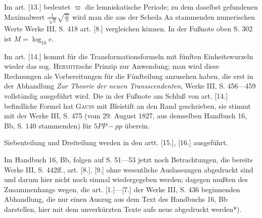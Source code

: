 \par\indent Im art. [13.] bedeutet $\varpi$ die lemniskatische Periode; zu dem daselbst gefundenen Maximalwert $\frac1{\sqrt[4]{2}}\sqrt{\frac\varpi\pi}$ wird man die aus der Scheda Aa stammenden numerischen Werte Werke III, S. 418 art. [8.] vergleichen können. In der Fußnote oben S. 302 ist $M=\log_{10}e$.
\par\medskip{}\par
\clearpage{}
\par\indent Im art. [14.] kommt für die Transformationsformeln mit fünften Einheitswurzeln wieder das sog. \textsc{Hermite}sche Prinzip zur Anwendung; man wird diese Rechnungen als Vorbereitungen für die Fünfteilung anzusehen haben, die erst in der Abhandlung \textit{Zur Theorie der neuen Transscendenten}, Werke III, S. 456---459 vollständig ausgeführt wird. Die in der Fußnote am Schluß von art. [14.] befindliche Formel hat \textsc{Gauss} mit Bleistift an den Rand geschrieben, sie stimmt mit der Werke III, S. 475 (vom 29. August 1827, aus demselben Handbuch 16, Bb, S. 140 stammenden) für $5PP-pp$ überein.
\par\indent Siebenteilung und Dreiteilung werden in den artt. [15.], [16.] ausgeführt.
\par\indent Im Handbuch 16, Bb, folgen auf S. 51---53 jetzt noch Betrachtungen, die bereits Werke III, S. 442ff., art. [8.], [9.] ohne wesentliche Auslassungen abgedruckt sind und darum hier nicht noch einmal wiedergegeben werden; dagegen mußten des Zusammenhangs wegen, die art. [1.]---[7.] der Werke III, S. 436 beginnenden Abhandlung, die nur einen Auszug aus dem Text des Handbuchs 16, Bb darstellen, hier mit dem unverkürzten Texte aufs neue abgedruckt werden*).
